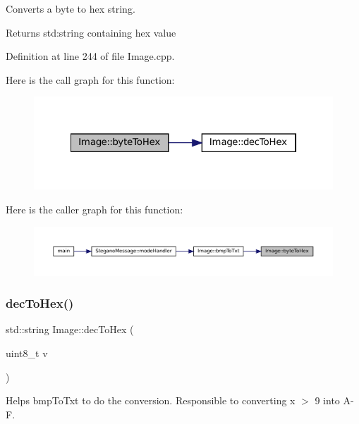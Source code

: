 Converts a byte to hex string. 

\begin{DoxyReturn}{Returns}
std\+:string containing hex value 
\end{DoxyReturn}


Definition at line 244 of file Image.\+cpp.

Here is the call graph for this function\+:
\nopagebreak
\begin{figure}[H]
\begin{center}
\leavevmode
\includegraphics[width=322pt]{classImage_ac1c14eba8a20f8bb71c3c21eaba90ecb_cgraph}
\end{center}
\end{figure}
Here is the caller graph for this function\+:
\nopagebreak
\begin{figure}[H]
\begin{center}
\leavevmode
\includegraphics[width=350pt]{classImage_ac1c14eba8a20f8bb71c3c21eaba90ecb_icgraph}
\end{center}
\end{figure}
\mbox{\label{classImage_a26f7e0b2649e2529df7e7aea46f2da4a}} 
\subsubsection{\texorpdfstring{decToHex()}{decToHex()}}
{\footnotesize\ttfamily std\+::string Image\+::dec\+To\+Hex (\begin{DoxyParamCaption}\item[{uint8\+\_\+t}]{v }\end{DoxyParamCaption})\hspace{0.3cm}{\ttfamily [static]}}



Helps bmp\+To\+Txt to do the conversion. Responsible to converting x $>$ 9 into A-\/F. 

